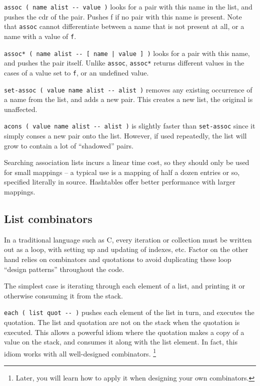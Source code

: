 \documentclass[english]{article}
\begin{document}
\texttt{assoc ( name alist -{}- value )} looks for a pair with this
name in the list, and pushes the cdr of the pair. Pushes f if no pair
with this name is present. Note that \texttt{assoc} cannot differentiate between
a name that is not present at all, or a name with a value of \texttt{f}.

\texttt{assoc{*} ( name alist -{}- {[} name | value {]} )} looks for
a pair with this name, and pushes the pair itself. Unlike \texttt{assoc},
\texttt{assoc{*}} returns different values in the cases of a value
set to \texttt{f}, or an undefined value.

\texttt{set-assoc ( value name alist -{}- alist )} removes any existing
occurrence of a name from the list, and adds a new pair. This creates
a new list, the original is unaffected.

\texttt{acons ( value name alist -{}- alist )} is slightly faster
than \texttt{set-assoc} since it simply conses a new pair onto the
list. However, if used repeatedly, the list will grow to contain a
lot of {}``shadowed'' pairs.

Searching association lists incurs a linear time cost, so they should
only be used for small mappings -- a typical use is a mapping of half
a dozen entries or so, specified literally in source. Hashtables offer
better performance with larger mappings.


\subsection{List combinators}

In a traditional language such as C, every iteration or collection
must be written out as a loop, with setting up and updating of indexes,
etc. Factor on the other hand relies on combinators and quotations
to avoid duplicating these loop ``design patterns'' throughout
the code.

The simplest case is iterating through each element of a list, and
printing it or otherwise consuming it from the stack.

\texttt{each ( list quot -{}- )} pushes each element of the list in
turn, and executes the quotation. The list and quotation are not on
the stack when the quotation is executed. This allows a powerful idiom
where the quotation makes a copy of a value on the stack, and consumes
it along with the list element. In fact, this idiom works with all
well-designed combinators.%
\footnote{Later, you will learn how to apply it when designing your own combinators.%
}
\end{document}
